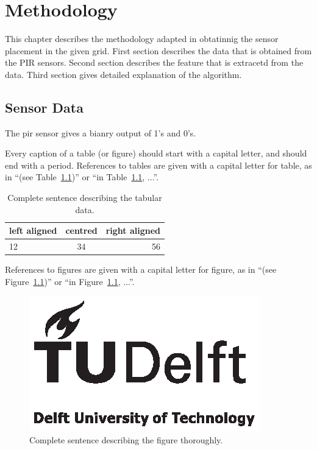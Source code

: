 \chapter{Methodology}
\label{chp:CHAPTERTITLE}
This chapter describes the methodology adapted in obtatinnig the sensor placement in the given grid. 
First section describes the data that is obtained from the PIR sensors.
Second section describes the feature that is extracetd from the data.
Third section gives detailed explanation of the algorithm.


\section{Sensor Data}
\label{sec:sensorData}
The pir sensor gives a bianry output of 1's and 0's.

Every caption of a table (or figure) should start with a capital letter, and should end with a period. References to tables are given with a capital letter for table, as in ``(see Table~\ref{tab:EXAMPLETABLE})'' or ``in Table~\ref{tab:EXAMPLETABLE}, ...''.

\begin{table}[htb]
\centering
\begin{tabular}{|l|c|r|}
\hline %
left aligned & centred & right aligned \\
\hline \hline
12           & 34      & 56            \\
\hline
\end{tabular}
\caption{Complete sentence describing the tabular data.}
\label{tab:EXAMPLETABLE}
\end{table}

References to figures are given with a capital letter for figure, as in ``(see Figure~\ref{fig:EXAMPLEFIGURE})'' or ``in Figure~\ref{fig:EXAMPLEFIGURE}, ...''.

\cite{b}
\cite{a}

\begin{figure}[htb]
\includegraphics[angle=180,width=\textwidth]{pics/TUD_logo_zw}
\caption{Complete sentence describing the figure thoroughly.}
\label{fig:EXAMPLEFIGURE}
\end{figure}

